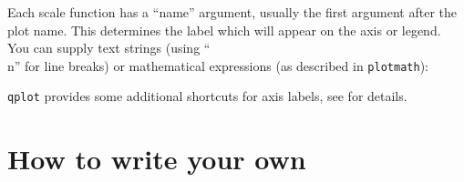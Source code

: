 Each scale function has a ``name'' argument, usually the first argument after the plot name.  This determines the label which will appear on the axis or legend. You can supply text strings (using ``\\n'' for line breaks) or mathematical expressions (as described in \verb|plotmath|):


\verb|qplot| provides some additional shortcuts for axis labels, see  for details.


\section{How to write your own}\label{sec:how_to_write_your_own_scales}




